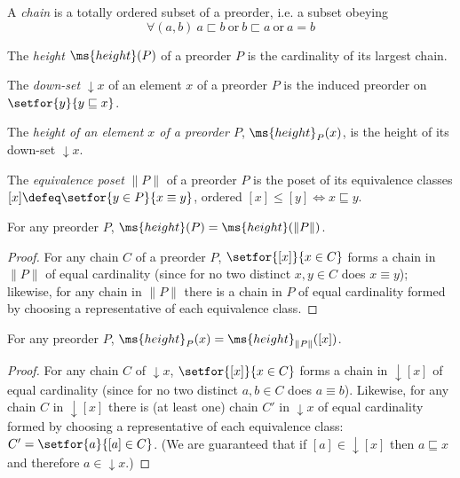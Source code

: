 \documentclass{article}
\renewcommand{\lor}{~\text{or}~}
\newcommand{\ale}{\sqsubseteq}
\newcommand{\alt}{\sqsubset}
\newcommand{\aeq}{\equiv}
\newcommand{\eqposet}[1]{\ms{Eq}(#1)}
\renewcommand{\eqposet}[1]{\|{#1}\|}
\newcommand{\eqclass}[1]{[#1]}
\newcommand{\height}{\ms{height}}
\newcommand{\down}[1]{{\mathop{\downarrow}{#1}}}
\begin{document}
\begin{definition}
  A \emph{chain} is a totally ordered subset of a preorder, i.e. a subset
  obeying \[\forall(a, b)\ a \alt b \lor b \alt a \lor a = b \]
\end{definition}

\begin{definition}
  The \emph{height} $\height(P)$ of a preorder $P$ is the cardinality of its largest chain.
\end{definition}


\begin{definition}
  The \emph{down-set} $\down{x}$ of an element $x$ of a preorder $P$ is the
  induced preorder on $\setfor{y}{y \ale x}$.
\end{definition}

\begin{definition}
  The \emph{height of an element $x$ of a preorder $P$}, $\height_P(x)$, is the
  height of its down-set $\down{x}$.
\end{definition}

\begin{definition}
  The \emph{equivalence poset} $\eqposet{P}$ of a preorder $P$ is the poset of
  its equivalence classes $\eqclass{x} \defeq \setfor{y \in P}{x \aeq y}$,
  ordered $\eqclass{x} \le \eqclass{y} \iff x \ale y$.
\end{definition}

\begin{theorem}\label{thm:height}
  For any preorder $P$, $\height(P) = \height(\eqposet{P})$.
\end{theorem}
\begin{proof}
  For any chain $C$ of a preorder $P$, $\setfor{\eqclass{x}}{x \in C}$ forms a
  chain in $\eqposet{P}$ of equal cardinality (since for no two distinct $x,y
  \in C$ does $x \aeq y$); likewise, for any chain in $\eqposet{P}$ there is a
  chain in $P$ of equal cardinality formed by choosing a representative of each
  equivalence class.
\end{proof}

\begin{theorem}\label{thm:height-elem}
  For any preorder $P$, $\height_P(x) = \height_{\eqposet{P}}([x])$.
\end{theorem}
\begin{proof}
  For any chain $C$ of $\down{x}$, $\setfor{\eqclass{x}}{x \in C}$ forms a chain
  in $\down{[x]}$ of equal cardinality (since for no two distinct $a,b \in C$
  does $a \equiv b$). Likewise, for any chain $C$ in $\down{\eqclass{x}}$ there
  is (at least one) chain $C'$ in $\down{x}$ of equal cardinality formed by
  choosing a representative of each equivalence class: $C' = \setfor{a}{[a] \in
    C}$. (We are guaranteed that if $\eqclass{a} \in \down{\eqclass{x}}$ then $a
  \ale x$ and therefore $a \in \down{x}$.)
\end{proof}
\end{document}
